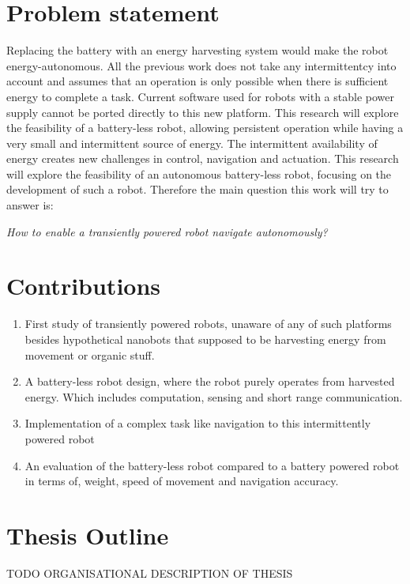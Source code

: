 \newpage

\section{Problem statement}



Replacing the battery with an energy harvesting system would make the robot energy-autonomous. 
All the previous work does not take any intermittentcy into account and assumes that an operation is only possible when there is sufficient energy to complete a task.
Current software used for robots with a stable power supply cannot be ported directly to this new platform.
This research will explore the feasibility of a battery-less robot, allowing persistent operation while having a very small and intermittent source of energy.
The intermittent availability of energy creates new challenges in control, navigation and actuation. 
This research will explore the feasibility of an autonomous battery-less robot, focusing on the development of such a robot. Therefore the main question this work will try to answer is:

\begin{center}
	\textit{How to enable a transiently powered robot navigate autonomously?}
\end{center}

\section{Contributions}

\begin{enumerate}

\item First study of transiently powered robots, unaware of any of such platforms besides hypothetical nanobots that supposed to be harvesting energy from movement or organic stuff.

\item A battery-less robot design, where the robot purely operates from harvested energy. Which includes computation, sensing and short range communication.

\item Implementation of a complex task like navigation to this intermittently powered robot

\item An evaluation of the battery-less robot compared to a battery powered robot in terms of, weight, speed of movement and navigation accuracy.

% 

\end{enumerate}


\section{Thesis Outline}


\vspace{1\baselineskip}

\noindent
TODO ORGANISATIONAL DESCRIPTION OF THESIS

